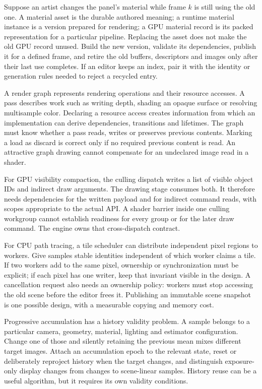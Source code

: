 Suppose an artist changes the panel's material while frame \(k\) is still using the old one. A material asset is the durable authored meaning; a runtime material instance is a version prepared for rendering; a GPU material record is its packed representation for a particular pipeline. Replacing the asset does not make the old GPU record unused. Build the new version, validate its dependencies, publish it for a defined frame, and retire the old buffers, descriptors and images only after their last use completes. If an editor keeps an index, pair it with the identity or generation rules needed to reject a recycled entry.

A render graph represents rendering operations and their resource accesses. A pass describes work such as writing depth, shading an opaque surface or resolving multisample color. Declaring a resource access creates information from which an implementation can derive dependencies, transitions and lifetimes. The graph must know whether a pass reads, writes or preserves previous contents. Marking a load as discard is correct only if no required previous content is read. An attractive graph drawing cannot compensate for an undeclared image read in a shader.

For GPU visibility compaction, the culling dispatch writes a list of visible object IDs and indirect draw arguments. The drawing stage consumes both. It therefore needs dependencies for the written payload and for indirect command reads, with scopes appropriate to the actual API. A shader barrier inside one culling workgroup cannot establish readiness for every group or for the later draw command. The engine owns that cross-dispatch contract.

For CPU path tracing, a tile scheduler can distribute independent pixel regions to workers. Give samples stable identities independent of which worker claims a tile. If two workers add to the same pixel, ownership or synchronization must be explicit; if each pixel has one writer, keep that invariant visible in the design. A cancellation request also needs an ownership policy: workers must stop accessing the old scene before the editor frees it. Publishing an immutable scene snapshot is one possible design, with a measurable copying and memory cost.

Progressive accumulation has a history validity problem. A sample belongs to a particular camera, geometry, material, lighting and estimator configuration. Change one of those and silently retaining the previous mean mixes different target images. Attach an accumulation epoch to the relevant state, reset or deliberately reproject history when the target changes, and distinguish exposure-only display changes from changes to scene-linear samples. History reuse can be a useful algorithm, but it requires its own validity conditions.

